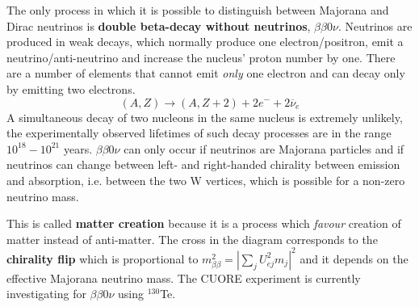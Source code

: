 \documentclass[10.75pt,a4paper,openright,bottom=2cm]{article}
\begin{document}
The only process in which it is possible to distinguish between Majorana and Dirac neutrinos is \textbf{double beta-decay without neutrinos}, $\beta\beta0\nu$. Neutrinos are produced in weak decays, which normally produce one electron/positron, emit a neutrino/anti-neutrino and increase the nucleus' proton number by one. There are a number of elements that cannot emit \textit{only} one electron and can decay only by emitting two electrons.
\[
(A,Z)\to(A,Z+2)+2e^-+2\overline{\nu}_e
\]
A simultaneous decay of two nucleons in the same nucleus is extremely unlikely, the experimentally observed lifetimes of such decay processes are in the range $10^{18}-10^{21}$ years. $\beta\beta0\nu$ can only occur if neutrinos are Majorana particles and if neutrinos can change between left- and right-handed chirality between emission and absorption, i.e. between the two W vertices, which is possible for a non-zero neutrino mass.
\begin{center}
\end{center}
This is called \textbf{matter creation} because it is a process which \textit{favour} creation of matter instead of anti-matter. The cross in the diagram corresponds to the \textbf{chirality flip} which is proportional to $m^2_{\beta\beta}=|\sum_jU_{ej}^2m_j|^2$ and it depends on the effective Majorana neutrino mass. The CUORE experiment is currently investigating for $\beta\beta0\nu$ using $^{130}$Te.
\end{document}
